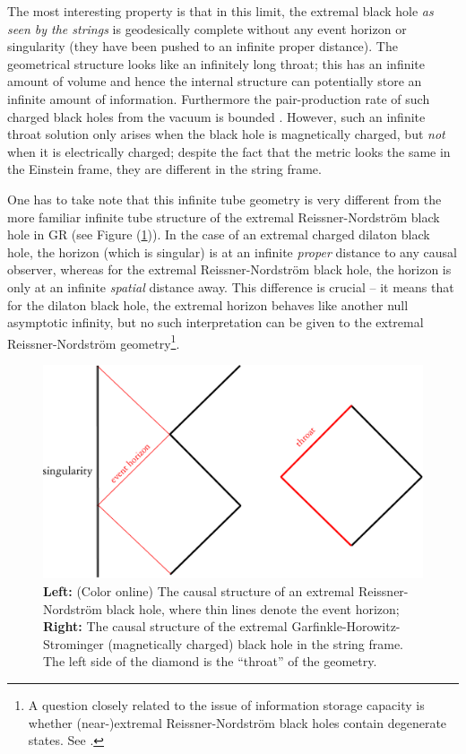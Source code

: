 \documentclass[12pt]{article}
\newcommand{\2}{$^2$}
\newcommand{\3}{$^3$}
\newcommand{\4}{$_4$}
\newcommand{\5}{$_5$}
\begin{document}
The most interesting property is that in this limit, the extremal black hole \emph{as seen by the strings} is geodesically complete without any event horizon or singularity (they have been pushed to an infinite proper distance). The geometrical structure looks like an infinitely long throat; this has an infinite amount of volume and hence the internal structure can potentially store an infinite amount of information. Furthermore the pair-production rate of such charged black holes from the vacuum is bounded \cite{Banks:1992is}. However, such an infinite throat solution only arises when the black hole is magnetically charged, but \emph{not} when it is electrically charged; despite the fact that the metric looks the same in the Einstein frame, they are different in the string frame.

One has to take note that this infinite tube geometry is very different from the more familiar infinite tube structure of the extremal Reissner-Nordstr\"om black hole in GR (see Figure (\ref{fig:extreme})). In the case of an extremal charged dilaton black hole, the horizon (which is singular) is at an infinite \emph{proper} distance to any causal observer, whereas for the extremal Reissner-Nordstr\"om black hole, the horizon is only at an infinite \emph{spatial} distance away. This difference is crucial -- it means that for the dilaton black hole, the extremal horizon behaves like another null asymptotic infinity, but no such interpretation can be given to the extremal Reissner-Nordstr\"om geometry\footnote{A question closely related to the issue of information storage capacity is whether (near-)extremal Reissner-Nordstr\"om black holes contain degenerate states. See \cite{0012020}.}. 

\begin{figure}
\begin{center}
\includegraphics[scale=0.6]{extreme-eps-converted-to.pdf}
\caption{\label{fig:extreme}\textbf{Left:} (Color online) The causal structure of an extremal Reissner-Nordstr\"om black hole, where thin lines denote the event horizon; \textbf{Right:} The causal structure of the extremal Garfinkle-Horowitz-Strominger (magnetically charged) black hole in the string frame. The left side of the diamond is the ``throat'' of the geometry.}
\end{center}
\end{figure}
\end{document}
